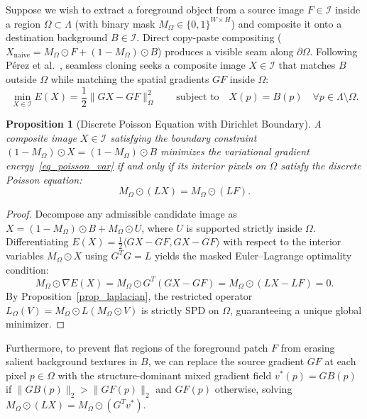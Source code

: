 \documentclass{amsart}
\newtheorem{proposition}[theorem]{Proposition}
\begin{document}
Suppose we wish to extract a foreground object from a source image $F \in \mathcal{I}$ inside a region $\Omega \subset \Lambda$ (with binary mask $M_\Omega \in \{0,1\}^{W \times H}$) and composite it onto a destination background $B \in \mathcal{I}$. Direct copy-paste compositing ($X_{\text{naive}} = M_\Omega \odot F + (1 - M_\Omega) \odot B$) produces a visible seam along $\partial\Omega$. Following P\'erez et al.~\cite{perez2003}, seamless cloning seeks a composite image $X \in \mathcal{I}$ that matches $B$ outside $\Omega$ while matching the spatial gradients $G F$ inside $\Omega$:
\begin{equation}\label{eq_poisson_var}
    \min_{X \in \mathcal{I}} E(X) = \frac{1}{2}\|G X - G F\|_{\Omega}^2 \qquad \text{subject to} \quad X(p) = B(p) \quad \forall p \in \Lambda \setminus \Omega.
\end{equation}

\begin{proposition}[Discrete Poisson Equation with Dirichlet Boundary]\label{prop_poisson}
    A composite image $X \in \mathcal{I}$ satisfying the boundary constraint $(1 - M_\Omega) \odot X = (1 - M_\Omega) \odot B$ minimizes the variational gradient energy~\eqref{eq_poisson_var} if and only if its interior pixels on $\Omega$ satisfy the discrete Poisson equation:
    \begin{equation}\label{eq_poisson_pde}
        M_\Omega \odot (L X) = M_\Omega \odot (L F).
    \end{equation}
\end{proposition}
\begin{proof}
    Decompose any admissible candidate image as $X = (1 - M_\Omega) \odot B + M_\Omega \odot U$, where $U$ is supported strictly inside $\Omega$. Differentiating $E(X) = \frac{1}{2}\langle G X - G F, G X - G F \rangle$ with respect to the interior variables $M_\Omega \odot X$ using $G^T G = L$ yields the masked Euler--Lagrange optimality condition:
    \[
        M_\Omega \odot \nabla E(X) = M_\Omega \odot G^T(G X - G F) = M_\Omega \odot (L X - L F) = 0.
    \]
    By Proposition~\ref{prop_laplacian}, the restricted operator $L_\Omega(V) = M_\Omega \odot L(M_\Omega \odot V)$ is strictly SPD on $\Omega$, guaranteeing a unique global minimizer.
\end{proof}

Furthermore, to prevent flat regions of the foreground patch $F$ from erasing salient background textures in $B$, we can replace the source gradient $G F$ at each pixel $p \in \Omega$ with the structure-dominant mixed gradient field $v^*(p) = G B(p)$ if $\|G B(p)\|_2 > \|G F(p)\|_2$ and $G F(p)$ otherwise, solving $M_\Omega \odot (L X) = M_\Omega \odot (G^T v^*)$.
\end{document}
